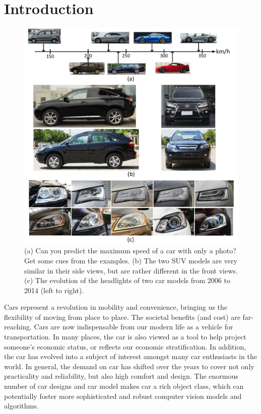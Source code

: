 \documentclass[10pt,twocolumn,letterpaper]{article}
\begin{document}
\section{Introduction}

\begin{figure}[t]\centering
\includegraphics[width=1\linewidth]{interest.pdf}
\caption{(a) Can you predict the maximum speed of a car with only a photo? Get some cues from the examples. (b) The two SUV models are very similar in their side views, but are rather different in the front views. (c) The evolution of the headlights of two car models from 2006 to 2014 (left to right).}
\label{fig:interest}
\vspace{-4pt}
\end{figure}

Cars represent a revolution in mobility and convenience, bringing us the flexibility of moving from place to place. The societal benefits (and cost) are far-reaching.
%
Cars are now indispensable from our modern life as a vehicle for transportation.
%
In many places, the car is also viewed as a tool to help project someone's economic status, or reflects our economic stratification. In addition, the car has evolved into a subject of interest amongst many car enthusiasts in the world.
%
In general, the demand on car has shifted over the years to cover not only practicality and reliability, but also high comfort and design.
%
The enormous number of car designs and car model makes car a rich object class, which can potentially foster more sophisticated and robust computer vision models and algorithms.
\end{document}
